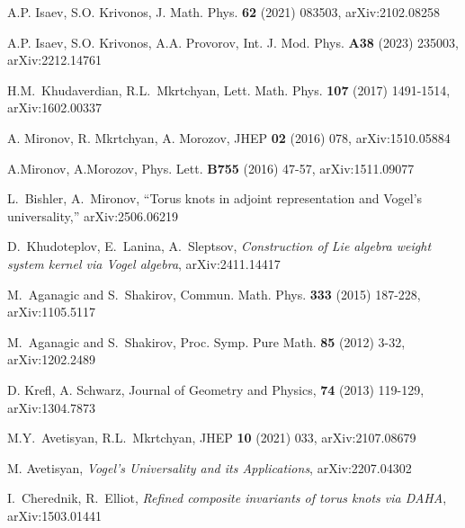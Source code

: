 \documentclass{article}
\begin{document}
\begin{thebibliography}{12}
 A.P. Isaev, S.O. Krivonos, %
 J. Math. Phys. {\bf 62} (2021) 083503, arXiv:2102.08258

 A.P. Isaev, S.O. Krivonos, A.A. Provorov, %
    Int. J. Mod. Phys. {\bf A38} (2023) 235003, arXiv:2212.14761

 H.M.~Khudaverdian, R.L.~Mkrtchyan,
Lett. Math. Phys. \textbf{107} (2017) 1491-1514,
arXiv:1602.00337

 A. Mironov, R. Mkrtchyan, A. Morozov, %
JHEP {\bf 02} (2016) 078, arXiv:1510.05884

 A.Mironov, A.Morozov, %
Phys. Lett. {\bf B755} (2016) 47-57, arXiv:1511.09077

 L.~Bishler, A.~Mironov,
``Torus knots in adjoint representation and Vogel's universality,''
arXiv:2506.06219

 D.~Khudoteplov, E.~Lanina, A.~Sleptsov,
{\sl Construction of Lie algebra weight system kernel via Vogel algebra},
arXiv:2411.14417

 M.~Aganagic and S.~Shakirov,
Commun. Math. Phys. \textbf{333} (2015) 187-228,
arXiv:1105.5117

 M.~Aganagic and S.~Shakirov,
Proc. Symp. Pure Math. \textbf{85} (2012) 3-32,
arXiv:1202.2489


 D. Krefl, A. Schwarz, %
Journal of Geometry and Physics, {\bf 74} (2013) 119-129, arXiv:1304.7873

 M.Y.~Avetisyan, R.L.~Mkrtchyan,
JHEP \textbf{10} (2021) 033,
arXiv:2107.08679

 M. Avetisyan, {\sl Vogel's Universality and its Applications}, arXiv:2207.04302

 I.~Cherednik, R.~Elliot,
{\sl Refined composite invariants of torus knots via DAHA},
arXiv:1503.01441


\end{thebibliography}
\end{document}
